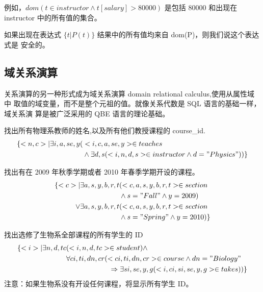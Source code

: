 \documentclass{dingjia}
\begin{document}
例如，$dom(t \in instructor \land t[salary] > 80000)$ 是包括 80000 和出现在
instructor 中的所有值的集合。

如果出现在表达式 $\{t|P(t)\}$ 结果中的所有值均来自 dom(P)，则我们说这个表达式是
安全的。

\subsection*{域关系演算}\label{sec:org3f5d3f6}

关系演算的另一种形式成为域关系演算 domain relational calculus,使用从属性域中
取值的域变量，而不是整个元祖的值。就像关系代数是 SQL 语言的基础一样，域关系演
算是被广泛采用的 QBE 语言的理论基础。

找出所有物理系教师的姓名,以及所有他们教授课程的 course\_id.
\begin{align}
\{ <n,c> | \exists i, a, se, y( & <i, c, a, se, y>  \in teaches \notag \\
& \land \exists d,s(<i, n, d, s> \in instructor \land d = "Physics"))\}
\end{align}

找出有在 2009 年秋季学期或者 2010 年春季学期开设的课程。
\begin{align}
\{ <c> | \exists a,s,y,b,r,t & (<c,a,s,y,b,r,t> \in section \notag \\
& \land s = "Fall" \land y = 2009) \notag \\
\lor \exists a,s,y,b,r,t & (<c,a,s,y,b,r,t> \in section \notag \\
& \land s = "Spring" \land y = 2010)\}
\end{align}

找出选修了生物系全部课程的所有学生的 ID
\begin{align}
\{ <i> | \exists n,d,tc & (<i,n,d,tc> \in student) \land \notag \\
& \forall ci, ti, dn, cr(<ci,ti,dn,cr> \in course \land dn = "Biology" \notag \\
& \qquad \qquad \qquad \Rightarrow \exists si,se,y,g(<i,ci,si,se,y,g> \in takes))\}
\end{align}
注意：如果生物系没有开设任何课程，将显示所有学生 ID。
\end{document}
